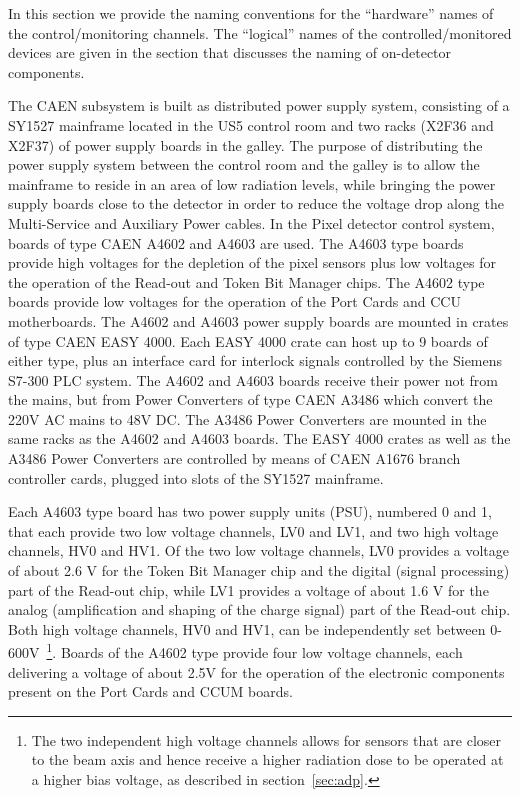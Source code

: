 \documentclass{cmspaper}
\begin{document}
In this section we provide the naming conventions for the ``hardware'' names of the control/monitoring channels.
The ``logical'' names of the controlled/monitored devices are given in the section that
discusses the naming of on-detector components. 

The CAEN subsystem is built as distributed power supply system,
consisting of a SY1527 mainframe located in the US5 control room and two racks (X2F36 and X2F37) of power supply boards in the galley.
The purpose of distributing the power supply system between the control room and the galley
is to allow the mainframe to reside in an area of low radiation levels,
while bringing the power supply boards close to the detector
in order to reduce the voltage drop along the Multi-Service and Auxiliary Power cables.
In the Pixel detector control system, boards of type CAEN A4602 and A4603 are used.
The A4603 type boards provide high voltages for the depletion of the pixel sensors plus low voltages for the operation of the Read-out and Token Bit Manager chips.
The A4602 type boards provide low voltages for the operation of the Port Cards and CCU motherboards.
The A4602 and A4603 power supply boards are mounted in crates of type CAEN EASY 4000.
Each EASY 4000 crate can host up to 9 boards of either type, 
plus an interface card for interlock signals controlled by the Siemens S7-300 PLC system.
The A4602 and A4603 boards receive their power not from the mains,
but from Power Converters of type CAEN A3486 which convert the 220V AC mains to 48V DC.
The A3486 Power Converters are mounted in the same racks as the A4602 and A4603 boards.
The EASY 4000 crates as well as the A3486 Power Converters are controlled by means of CAEN A1676 branch controller cards,
plugged into slots of the SY1527 mainframe.

Each A4603 type board has two power supply units (PSU), numbered 0 and 1,
that each provide two low voltage channels, LV0 and LV1, and two high voltage channels, HV0 and HV1.
Of the two low voltage channels, 
LV0 provides a voltage of about 2.6 V for the Token Bit Manager chip and the digital (signal processing) part of the Read-out chip,
while LV1 provides a voltage of about 1.6 V for the analog (amplification and shaping of the charge signal) part of the Read-out chip.
Both high voltage channels, HV0 and HV1, can be independently set between 0-600V~\footnote{The
two independent high voltage channels allows for sensors that are closer to the beam axis
and hence receive a higher radiation dose to be operated at a higher bias voltage,
as described in section~\ref{sec:adp}.}.
Boards of the A4602 type provide four low voltage channels,
each delivering a voltage of about 2.5V 
for the operation of the electronic components present on the Port Cards and CCUM boards.
\end{document}
